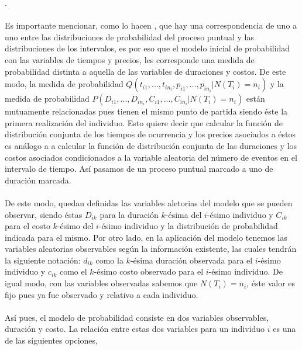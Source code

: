 .\\
\\
Es importante mencionar, como lo hacen \cite{daley2003}, que hay una correspondencia de uno a uno entre las distribuciones de probabilidad del proceso puntual y las distribuciones de los intervalos, es por eso que el modelo inicial de probabilidad con las variables de tiempos y precios, les corresponde una medida de probabilidad distinta a aquella de las variables de duraciones y costos. De este modo, la medida de probabilidad $Q(t_{i1},...,t_{in_i},p_{i1},...,p_{in_i}|N(T_i)=n_i)$ y la medida de probabilidad $P(D_{i1},...,D_{in_i},C_{i1},...,C_{in_i}|N(T_i)=n_i)$ est\'an mutuamente relacionadas pues tienen el mismo punto de partida siendo \'este la primera realizaci\'on del individuo.
Esto quiere decir que calcular la funci\'on de distribuci\'on conjunta de los tiempos de ocurrencia y los precios asociados a \'estos es an\'alogo a a calcular la funci\'on de distribuci\'on conjunta de las duraciones y los costos asociados condicionados a la variable aleatoria del n\'umero de eventos en el intervalo de tiempo. As\'i pasamos de un proceso puntual marcado a uno de duraci\'on marcada.\\
\\
De este modo, quedan definidas las variables aletorias del modelo que se pueden observar, siendo \'estas $D_{ik}$ para la duraci\'on $k$-\'esima del $i$-\'esimo individuo y $C_{ik}$ para el costo $k$-\'esimo del $i$-\'esimo individuo y la distribuci\'on de probabilidad indicada para el mismo. Por otro lado, en la aplicaci\'on del modelo tenemos las variables aleatorias observables seg\'un la informaci\'on existente, las cuales tendr\'an la siguiente notaci\'on: $d_{ik}$ como la $k$-\'esima duraci\'on observada para el $i$-\'esimo individuo y $c_{ik}$ como el $k$-\'esimo costo observado para el $i$-\'esimo individuo. De igual modo, con las variables observadas sabemos que $N(T_i)=n_i$, \'este valor es fijo pues ya fue observado y relativo a cada individuo.\\
\\
As\'i pues, el modelo de probabilidad consiste en dos variables observables, duraci\'on y costo. La relaci\'on entre estas dos variables para un individuo $i$ es una de las siguientes opciones,\\
\\
